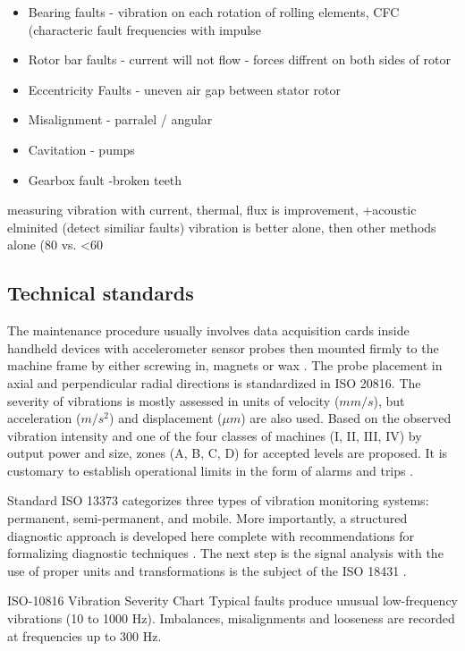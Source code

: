 \begin{itemize}
\item Bearing faults - vibration on each rotation of rolling elements, CFC (characteric fault frequencies with impulse
\item Rotor bar faults - current will not flow - forces diffrent on both sides of rotor
\item Eccentricity Faults - uneven air gap between stator rotor
\item Misalignment - parralel / angular
\item Cavitation - pumps
\item Gearbox fault -broken teeth
\end{itemize}
measuring vibration with current, thermal, flux is improvement, +acoustic elminited (detect similiar faults)
vibration is better alone, then other methods alone (80 vs. <60%
 \cite{goel_methodology_2022}

\subsection{Technical standards}
The maintenance procedure usually involves data acquisition cards inside handheld devices with accelerometer sensor probes then mounted firmly to the machine frame by either screwing in, magnets or wax \cite{ziaran_technicka_2013}. The probe placement in axial and perpendicular radial directions is standardized in ISO 20816. The severity of vibrations is mostly assessed in units of velocity ($mm/s$), but acceleration ($m/s^2$) and displacement ($\mu m$) are also used. Based on the observed vibration intensity and one of the four classes of machines (I, II, III, IV) by output power and size, zones (A, B, C, D) for accepted levels are proposed. It is customary to establish operational limits in the form of alarms and trips \cite{iso_20816}.

Standard ISO 13373 categorizes three types of vibration monitoring systems: permanent, semi-permanent, and mobile. More importantly, a structured diagnostic approach is developed here complete with recommendations for formalizing diagnostic techniques \cite{iso_13373}. The next step is the signal analysis with the use of proper units and transformations is the subject of the ISO 18431 \cite{iso_18431}.

ISO-10816 Vibration Severity Chart
Typical faults produce unusual low-frequency vibrations (10 to 1000 Hz).
Imbalances, misalignments and looseness are recorded at frequencies up to 300 Hz.


